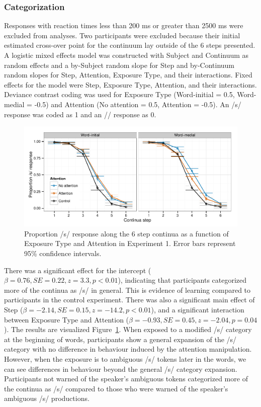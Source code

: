 \subsubsection{Categorization}

Responses with reaction times less than 200 ms or greater than 2500 ms were excluded from analyses. 
Two participants were excluded because their initial estimated cross-over point for the continuum lay outside of the 6 steps presented.  
A logistic mixed effects model was constructed with Subject and Continuum as random effects and a by-Subject random slope for Step and by-Continuum random slopes for Step, Attention, Exposure Type, and their interactions. 
Fixed effects for the model were Step, Exposure Type, Attention, and their interactions.  
Deviance contrast coding was used for Exposure Type (Word-initial = 0.5, Word-medial = -0.5) and Attention (No attention = 0.5, Attention = -0.5).
An /s/ response was coded as 1 and an /\textesh/ response as 0.

\begin{figure}[!ht]
\caption{Proportion /s/ response along the 6 step continua as a function of Exposure Type and Attention in Experiment 1.    Error bars represent 95\% confidence intervals.}
\label{fig:exp1categ}
\begin{center}
\includegraphics[width=\textwidth]{graphs/exp1_categresults}
\end{center}
\end{figure}

There was a significant effect for the intercept ($\beta = 0.76, SE = 0.22, z = 3.3, p < 0.01$), indicating that participants categorized more of the continua as /s/ in general.  
This is evidence of learning compared to participants in the control experiment.
There was also a significant main effect of Step ($\beta = -2.14, SE = 0.15, z = -14.2, p < 0.01$), and a significant interaction between Exposure Type and Attention ($\beta = -0.93, SE = 0.45, z = -2.04, p = 0.04$).  The results are visualized Figure~\ref{fig:exp1categ}.
When exposed to a modified /s/ category at the beginning of words, participants show a general expansion of the /s/ category with no difference in behaviour induced by the attention manipulation.  
However, when the exposure is to ambiguous /s/ tokens later in the words, we can see differences in behaviour beyond the general /s/ category expansion.  
Participants not warned of the speaker's ambiguous tokens categorized more of the continua as /s/ compared to those who were warned of the speaker's ambiguous /s/ productions.

